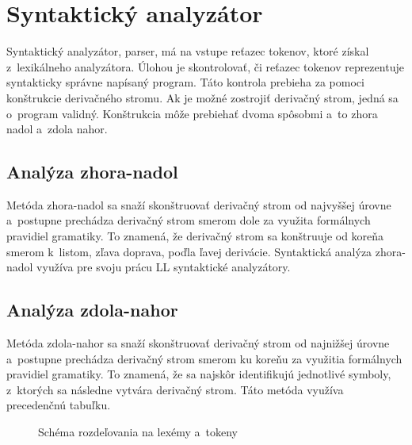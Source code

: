 \section{Syntaktický analyzátor}
Syntaktický analyzátor, parser, má na vstupe reťazec tokenov, ktoré získal
z~lexikálneho analyzátora. Úlohou je skontrolovať, či
reťazec tokenov reprezentuje syntakticky správne napísaný program. Táto kontrola
prebieha za pomoci konštrukcie derivačného stromu. Ak je možné zostrojiť derivačný strom,
jedná sa o~program validný. Konštrukcia môže prebiehať dvoma spôsobmi a~to zhora
nadol a~zdola nahor. \cite{meduna}

\subsection{Analýza zhora-nadol}
Metóda zhora-nadol sa snaží skonštruovať derivačný strom od najvyššej úrovne a~po\-stu\-pne pre\-chá\-dza
derivačný strom smerom dole za využita formálnych pravidiel gramatiky. To znamená, že de\-ri\-vač\-ný strom sa
konštruuje od koreňa smerom k~listom, zľava doprava, poďla ľavej derivácie. Syntaktická analýza
zhora-nadol využíva pre svoju prácu LL syntaktické analyzátory. \cite{aho}

\subsection{Analýza zdola-nahor}
Metóda zdola-nahor sa snaží skonštruovať derivačný strom od najnižšej úrovne a~postupne prechádza
derivačný strom smerom ku koreňu za využitia formálnych pravidiel gramatiky. To znamená, že sa
najskôr identifikujú jednotlivé symboly, z~ktorých sa následne vytvára derivačný strom. Táto metóda
využíva precedenčnú tabuľku. \cite{aho}

\begin{center}
\begin{figure}
\caption{Schéma rozdeľovania na lexémy a~tokeny}
\label{fig:lex}
\end{figure}
\end{center}

